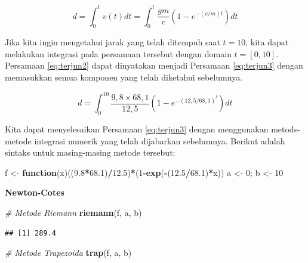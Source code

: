 \documentclass[
]{book}
\newenvironment{Shaded}{\begin{snugshade}}{\end{snugshade}}
\newcommand{\CommentTok}[1]{\textcolor[rgb]{0.56,0.35,0.01}{\textit{#1}}}
\newcommand{\ControlFlowTok}[1]{\textcolor[rgb]{0.13,0.29,0.53}{\textbf{#1}}}
\newcommand{\DecValTok}[1]{\textcolor[rgb]{0.00,0.00,0.81}{#1}}
\newcommand{\FloatTok}[1]{\textcolor[rgb]{0.00,0.00,0.81}{#1}}
\newcommand{\FunctionTok}[1]{\textcolor[rgb]{0.13,0.29,0.53}{\textbf{#1}}}
\newcommand{\NormalTok}[1]{#1}
\newcommand{\OtherTok}[1]{\textcolor[rgb]{0.56,0.35,0.01}{#1}}
\newcommand{\SpecialCharTok}[1]{\textcolor[rgb]{0.81,0.36,0.00}{\textbf{#1}}}
\theoremstyle{definition}
\theoremstyle{definition}
\theoremstyle{definition}
\theoremstyle{definition}
\theoremstyle{remark}
\begin{document}
\begin{equation}
d=\int_{0}^{t}v\left(t\right)dt=\int_{0}^{t}\frac{gm}{c}\left(1-e^{-\left(c/m\right)t}\right)dt
  \label{eq:terjun2}
\end{equation}

Jika kita ingin mengetahui jarak yang telah ditempuh saat \(t=10\), kita dapat melakukan integrasi pada persamaan tersebut dengan domain \(t=\left[0,10\right]\). Persamaan \eqref{eq:terjun2} dapat dinyatakan menjadi Persamaan \eqref{eq:terjun3} dengan memasukkan semua komponen yang telah diketahui sebelumnya.

\begin{equation}
d=\int_{0}^{10}\frac{9,8\times 68,1}{12,5}\left(1-e^{-\left(12,5/68,1\right)^t}\right)dt
  \label{eq:terjun3}
\end{equation}

Kita dapat menyelesaikan Persamaan \eqref{eq:terjun3} dengan menggunakan metode-metode integrasi numerik yang telah dijabarkan sebelumnya. Berikut adalah sintaks untuk masing-masing metode tersebut:

\begin{Shaded}
\begin{Highlighting}[]
\NormalTok{f }\OtherTok{\textless{}{-}} \ControlFlowTok{function}\NormalTok{(x)((}\FloatTok{9.8}\SpecialCharTok{*}\FloatTok{68.1}\NormalTok{)}\SpecialCharTok{/}\FloatTok{12.5}\NormalTok{)}\SpecialCharTok{*}\NormalTok{(}\DecValTok{1}\SpecialCharTok{{-}}\FunctionTok{exp}\NormalTok{(}\SpecialCharTok{{-}}\NormalTok{(}\FloatTok{12.5}\SpecialCharTok{/}\FloatTok{68.1}\NormalTok{)}\SpecialCharTok{*}\NormalTok{x))}
\NormalTok{a }\OtherTok{\textless{}{-}} \DecValTok{0}\NormalTok{; b }\OtherTok{\textless{}{-}} \DecValTok{10}
\end{Highlighting}
\end{Shaded}

\textbf{Newton-Cotes}

\begin{Shaded}
\begin{Highlighting}[]
\CommentTok{\# Metode Riemann}
\FunctionTok{riemann}\NormalTok{(f, a, b)}
\end{Highlighting}
\end{Shaded}

\begin{verbatim}
## [1] 289.4
\end{verbatim}

\begin{Shaded}
\begin{Highlighting}[]
\CommentTok{\# Metode Trapezoida}
\FunctionTok{trap}\NormalTok{(f, a, b)}
\end{Highlighting}
\end{Shaded}
\end{document}

